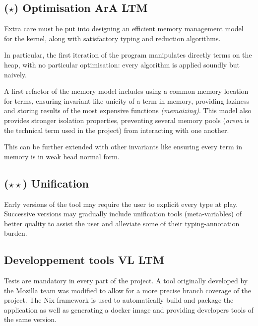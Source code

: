\documentclass[twocolumn]{article}
\newcommand{\members}[1]{\texorpdfstring{\hfill\scriptsize #1}{}}
\newcommand{\etun}{{\color{Green} ($\star$)} }
\newcommand{\etde}{{\color{Orange} ($\star\star$)} }
\begin{document}
\subsection{\etun Optimisation \members{ArA LTM}}
Extra care must be put into
designing an efficient memory management model for the kernel, along with
satisfactory typing and reduction algorithms.

In particular, the first iteration of the program manipulates directly terms on
the heap, with no particular optimisation: every algorithm is applied soundly
but naively.

A first refactor of the memory model includes using a common memory location for
terms, ensuring invariant like unicity of a term in memory, providing laziness
and storing results of the most expensive functions \emph{(memoizing)}. This
model also provides stronger isolation properties, preventing several memory
pools (\emph{arena} is the technical term used in the project) from interacting
with one another.

This can be further extended with other invariants like ensuring every term in
memory is in weak head normal form.

\subsection{\etde Unification}\label{sec:unification}
Early versions of the tool may require the user
to explicit every type at play. Successive versions may gradually include
unification tools (meta-variables) of better quality to assist the user and
alleviate some of their typing-annotation burden.

\subsection{Developpement tools \members{VL LTM}}
Tests are mandatory in every
part of the project. A tool originally developed by the Mozilla team was
modified to allow for a more precise branch coverage of the project. The Nix
framework is used to automatically build and package the application as well as
generating a docker image and providing developers tools of the same version.

\end{document}
